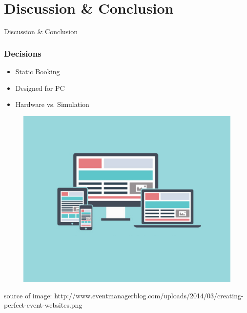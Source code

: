 \section{Discussion \& Conclusion}
\begin{frame}
\begin{center}
\Huge Discussion \& Conclusion
\end{center}
\end{frame}
\begin{frame}
\frametitle{Decisions}
\begin{itemize}
	\item Static Booking
	\item Designed for PC
	\item Hardware vs. Simulation
\end{itemize}
\begin{figure}
	\centering
	\includegraphics[scale=0.15]{Media/Web}
\end{figure}

\bigskip
\btVFill
\tiny source of image: http://www.eventmanagerblog.com/uploads/2014/03/creating-perfect-event-websites.png
\end{frame}

